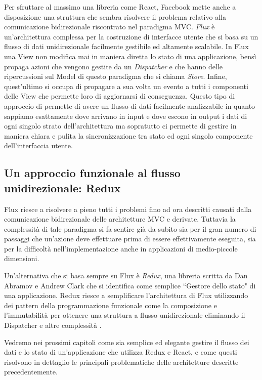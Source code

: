 Per sfruttare al massimo una libreria come React, Facebook mette anche a disposizione una struttura che sembra risolvere il problema relativo alla comunicazione bidirezionale riscontrato nel paradigma MVC. \textit{Flux} è un'architettura complessa per la costruzione di interfacce utente che si basa su un flusso di dati unidirezionale facilmente gestibile ed altamente scalabile. In Flux una View non modifica mai in maniera diretta lo stato di una applicazione, bensì propaga azioni che vengono gestite da un \textit{Dispatcher} e che hanno delle ripercussioni sul Model di questo paradigma che si chiama \textit{Store}. Infine, quest'ultimo si occupa di propagare a sua volta un evento a tutti i componenti delle View che permette loro di aggiornarsi di conseguenza. Questo tipo di approccio di permette di avere un flusso di dati facilmente analizzabile in quanto sappiamo esattamente dove arrivano in input e dove escono in output i dati di ogni singolo strato dell'architettura ma sopratutto ci permette di gestire in maniera chiara e pulita la sincronizzazione tra stato ed ogni singolo componente dell'interfaccia utente.

\subsection{Un approccio funzionale al flusso unidirezionale: Redux}
Flux riesce a risolvere a pieno tutti i problemi fino ad ora descritti causati dalla comunicazione bidirezionale delle architetture MVC e derivate. Tuttavia la complessità di tale paradigma si fa sentire già da subito sia per il gran numero di passaggi che un'azione deve effettuare prima di essere effettivamente eseguita, sia per la difficoltà nell'implementazione anche in applicazioni di medio-piccole dimensioni.

Un'alternativa che si basa sempre su Flux è \textit{Redux}, una libreria scritta da Dan Abramov e Andrew Clark che si identifica come semplice “Gestore dello stato" di una applicazione. Redux riesce a semplificare l'architettura di Flux utilizzando dei pattern della programmazione funzionale come la composizione e l'immutabilità per ottenere una struttura a flusso unidirezionale eliminando il Dispatcher e altre complessità \cite{AbramovOnReduxVsFlux}.

Vedremo nei prossimi capitoli come sia semplice ed elegante gestire il flusso dei dati e lo stato di un'applicazione che utilizza Redux e React, e come questi risolvono in dettaglio le principali problematiche delle architetture descritte precedentemente.